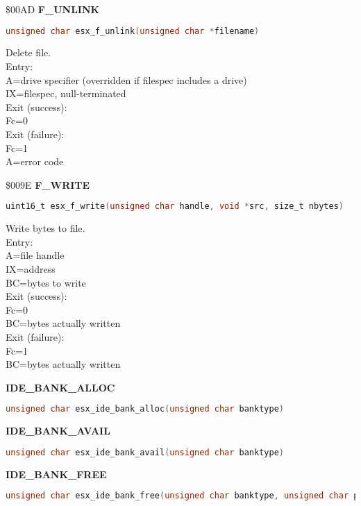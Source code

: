 \$00AD \textbf{F\_UNLINK}

\begin{lstlisting}[language=C]
unsigned char esx_f_unlink(unsigned char *filename)
\end{lstlisting}

Delete file.\\
Entry:\\
A=drive specifier (overridden if filespec includes a drive)\\
IX=filespec, null-terminated\\
Exit (success):\\
Fc=0\\
Exit (failure):\\
Fc=1\\
A=error code

\$009E \textbf{F\_WRITE}

\begin{lstlisting}[language=C]
uint16_t esx_f_write(unsigned char handle, void *src, size_t nbytes)
\end{lstlisting}

Write bytes to file.\\
Entry:\\
A=file handle\\
IX=address\\
BC=bytes to write\\
Exit (success):\\
Fc=0\\
BC=bytes actually written\\
Exit (failure):\\
Fc=1\\
BC=bytes actually written

\textbf{IDE\_BANK\_ALLOC}

\begin{lstlisting}[language=C]
unsigned char esx_ide_bank_alloc(unsigned char banktype)
\end{lstlisting}

\textbf{IDE\_BANK\_AVAIL}

\begin{lstlisting}[language=C]
unsigned char esx_ide_bank_avail(unsigned char banktype)
\end{lstlisting}

\textbf{IDE\_BANK\_FREE}

\begin{lstlisting}[language=C]
unsigned char esx_ide_bank_free(unsigned char banktype, unsigned char page)
\end{lstlisting}

